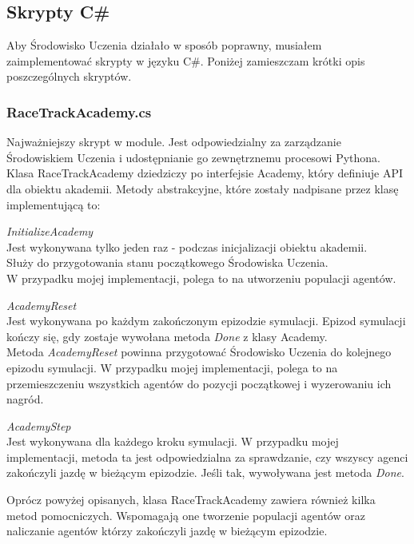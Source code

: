 \newpage
\subsection{Skrypty C\#}
Aby Środowisko Uczenia działało w sposób poprawny, musiałem zaimplementować skrypty w języku C\#. Poniżej zamieszczam krótki opis poszczególnych skryptów.
\subsubsection{RaceTrackAcademy.cs}
Najważniejszy skrypt w module. Jest odpowiedzialny za zarządzanie Środowiskiem Uczenia i udostępnianie go zewnętrznemu procesowi Pythona. \\
Klasa RaceTrackAcademy dziedziczy po interfejsie Academy, który definiuje API dla obiektu akademii.
Metody abstrakcyjne, które zostały nadpisane przez klasę implementującą to:
\begin{enumerate*}
\item \textit{InitializeAcademy} \\
Jest wykonywana tylko jeden raz - podczas inicjalizacji obiektu akademii. \\
Służy do przygotowania stanu początkowego Środowiska Uczenia. \\
W przypadku mojej implementacji, polega to na utworzeniu populacji agentów.
\item \textit{AcademyReset} \\
Jest wykonywana po każdym zakończonym epizodzie symulacji. Epizod symulacji kończy się, gdy zostaje wywołana metoda \textit{Done} z klasy Academy. \\
Metoda \textit{AcademyReset} powinna przygotować Środowisko Uczenia do kolejnego epizodu symulacji. W przypadku mojej implementacji, polega to na przemieszczeniu wszystkich agentów do pozycji początkowej i wyzerowaniu ich nagród.
\item \textit{AcademyStep} \\
Jest wykonywana dla każdego kroku symulacji. W przypadku mojej implementacji, metoda ta jest odpowiedzialna za sprawdzanie, czy wszyscy agenci zakończyli jazdę w bieżącym epizodzie. Jeśli tak, wywoływana jest metoda \textit{Done}.
\end{enumerate*}

Oprócz powyżej opisanych, klasa RaceTrackAcademy zawiera również kilka metod pomocniczych. Wspomagają one tworzenie populacji agentów oraz naliczanie agentów którzy zakończyli jazdę w bieżącym epizodzie.

